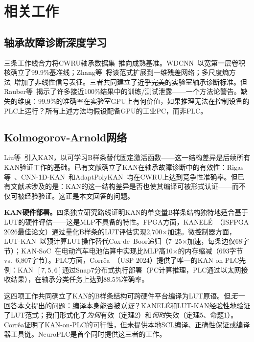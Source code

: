 \documentclass[journal,onecolumn]{IEEEtran}
\newcommand{\neuroplc}{NeuroPLC\xspace}
\theoremstyle{definition}
\theoremstyle{plain}
\theoremstyle{remark}
\begin{document}
\section{相关工作}
\label{sec:related}

\subsection{轴承故障诊断深度学习}

三条工作线合力将CWRU轴承数据集~\cite{cwru_bearing}推向成熟基准。WDCNN~\cite{zhang2017wdcnn}以宽第一层卷积核确立了99.9\%基准线；Zhang等~\cite{zhang2020resnet1d}将该范式扩展到一维残差网络；多尺度熵方法~\cite{azami2017rcmde,chen2024hrcgmfde}增加了非线性信号表征。三者共同建立了近乎完美的实验室轴承诊断标准。但Rauber等~\cite{rauber2020experimental}揭示了许多接近100\%结果中的训练/测试泄露——一个方法论警告。缺失的维度：99.9\%的准确率在实验室GPU上有何价值，如果推理无法在控制设备的PLC上运行？所有上述方法均假设配备GPU的工业PC，而非PLC。

\subsection{Kolmogorov-Arnold网络}

Liu等~\cite{liu2024kan}引入KAN，以可学习B样条替代固定激活函数——这一结构差异是后续所有KAN验证工作的基础。已有文献确立了KAN在轴承故障诊断中的有效性：Rigas等~\cite{rigas2025explainable}、CNN-1D-KAN~\cite{cnn1dkan2025}和AdaptPolyKAN~\cite{adaptpolykan2025}均在CWRU上达到竞争性准确率。但已有文献\textit{未}涉及的是：KAN的这一结构差异是否也使其编译可被形式认证——而不仅可被经验验证。这正是本文回答的问题。

\textbf{KAN硬件部署。}四条独立研究路线证明KAN的单变量B样条结构独特地适合基于LUT的硬件评估——这是MLP不具备的特性。FPGA方面，KANEL\'{E}~\cite{kanele2026}（ISFPGA 2026最佳论文）通过量化B样条的LUT评估实现2,700$\times$加速。微控制器方面，LUT-KAN~\cite{lutkan2025}以预计算LUT操作替代Cox-de~Boor递归（7--25$\times$加速，每条边仅68字节）；KAN-SoC~\cite{flores2025kan}在电动汽车电池估算中实现比MLP高10$\times$的内存缩减（693字节vs.~6,807字节）。PLC方面，Corr\^ea~\cite{correa2024kanplc}（USP 2024）提供了唯一的KAN-on-PLC先例：KAN~$[7,5,6]$通过Snap7分布式执行部署（PC计算推理，PLC通过以太网接收结果），在轴承分类任务上达到88.5\%准确率。

这四项工作共同确立了KAN的B样条结构可跨硬件平台编译为LUT原语。但\textit{无一}回答本文提出的问题：编译本身能否被\textit{认证}？KANEL\'{E}和LUT-KAN经验性地验证了LUT范式；我们形式化了\textit{为何}有效（定理2）和\textit{何时}失效（定理5、命题1）。Corr\^ea证明了KAN-on-PLC的可行性，但未提供本地SCL编译、正确性保证或编译器工具链。\neuroplc{}是首个同时提供这三者的工作。
\end{document}
